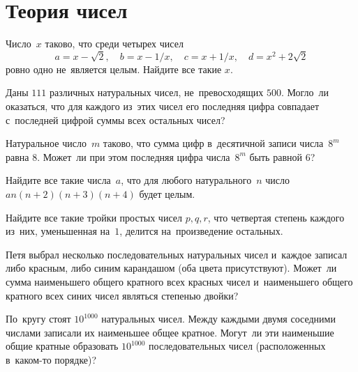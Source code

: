 
\section*{Теория чисел}


\begin{problems}

\item
Число~$x$ таково, что среди четырех чисел
\[
    a = x - \sqrt{2}
, \quad
    b = x - 1 / x
, \quad
    c = x + 1 / x
, \quad
    d = x^2 + 2 \sqrt{2}
\]
ровно одно не~является целым.
Найдите все такие $x$.

\item
Даны $111$ различных натуральных чисел, не~превосходящих $500$.
Могло~ли оказаться, что для каждого из~этих чисел его последняя цифра совпадает
с~последней цифрой суммы всех остальных чисел?

\item
Натуральное число~$m$ таково, что сумма цифр в~десятичной записи числа~$8^m$
равна $8$.
Может~ли при этом последняя цифра числа~$8^m$ быть равной $6$?

\item
Найдите все такие числа~$a$, что для любого натурального~$n$ число
$a n (n + 2) (n + 3) (n + 4)$ будет целым.

\item
Найдите все такие тройки простых чисел $p, q, r$, что четвертая степень каждого
из~них, уменьшенная на~$1$, делится на~произведение остальных.

\item
Петя выбрал несколько последовательных натуральных чисел и~каждое записал либо
красным, либо синим карандашом (оба цвета присутствуют).
Может~ли сумма наименьшего общего кратного всех красных чисел и~наименьшего
общего кратного всех синих чисел являться степенью двойки?

\item
По~кругу стоят $10^{1000}$ натуральных чисел.
Между каждыми двумя соседними числами записали их наименьшее общее кратное.
Могут~ли эти наименьшие общие кратные образовать $10^{1000}$ последовательных
чисел (расположенных в~каком-то порядке)?

\end{problems}

